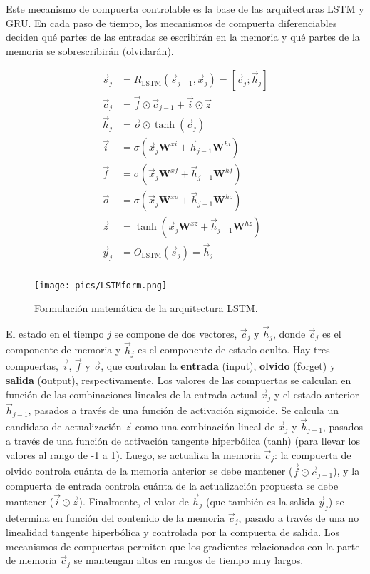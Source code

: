 Este mecanismo de compuerta controlable es la base de las arquitecturas LSTM y GRU. En cada paso de tiempo, los mecanismos de compuerta diferenciables deciden qué partes de las entradas se escribirán en la memoria y qué partes de la memoria se sobrescribirán (olvidarán).


\begin{align*}
\vec{s}_j & = R_{\text{LSTM}}(\vec{s}_{j-1}, \vec{x}_j) = [\vec{c}_j; \vec{h}_j] \\
\vec{c}_j & = \vec{f} \odot \vec{c}_{j-1} +  \vec{i} \odot \vec{z} \\
\vec{h}_j & = \vec{o} \odot \tanh(\vec{c}_j) \\
\vec{i} & = \sigma(\vec{x}_j \mathbf{W}^{xi} + \vec{h}_{j-1} \mathbf{W}^{hi}) \\
\vec{f} & = \sigma(\vec{x}_j \mathbf{W}^{xf} + \vec{h}_{j-1} \mathbf{W}^{hf}) \\
\vec{o} & = \sigma(\vec{x}_j \mathbf{W}^{xo} + \vec{h}_{j-1} \mathbf{W}^{ho}) \\
\vec{z} & = \tanh(\vec{x}_j \mathbf{W}^{xz} + \vec{h}_{j-1} \mathbf{W}^{hz}) \\
\vec{y}_j & = O_{\text{LSTM}}(\vec{s}_j) = \vec{h}_j \\
\end{align*}



\begin{figure}[h]
\centering
  \texttt{[image: pics/LSTMform.png]}
  \caption{Formulación matemática de la arquitectura LSTM.}
\end{figure}

El estado en el tiempo $j$ se compone de dos vectores, $\vec{c}_j$ y $\vec{h}_{j}$, donde $\vec{c}_j$ es el componente de memoria y $\vec{h}_j$ es el componente de estado oculto. Hay tres compuertas, $\vec{i}$, $\vec{f}$ y $\vec{o}$, que controlan la \textbf{entrada} (\textbf{i}nput), \textbf{olvido} (\textbf{f}orget) y \textbf{salida} (\textbf{o}utput), respectivamente. Los valores de las compuertas se calculan en función de las combinaciones lineales de la entrada actual $\vec{x}_j$ y el estado anterior $\vec{h}_{j-1}$, pasados a través de una función de activación sigmoide. Se calcula un candidato de actualización $\vec{z}$ como una combinación lineal de $\vec{x}_j$ y $\vec{h}_{j-1}$, pasados a través de una función de activación tangente hiperbólica (tanh) (para llevar los valores al rango de -1 a 1). Luego, se actualiza la memoria $\vec{c}_j$: la compuerta de olvido controla cuánta de la memoria anterior se debe mantener ($\vec{f} \odot \vec{c}_{j-1}$), y la compuerta de entrada controla cuánta de la actualización propuesta se debe mantener ($\vec{i} \odot  \vec{z}$). Finalmente, el valor de $\vec{h}_j$ (que también es la salida $\vec{y}_j$) se determina en función del contenido de la memoria $\vec{c}_j$, pasado a través de una no linealidad tangente hiperbólica y controlada por la compuerta de salida. Los mecanismos de compuertas permiten que los gradientes relacionados con la parte de memoria $\vec{c}_j$ se mantengan altos en rangos de tiempo muy largos.

